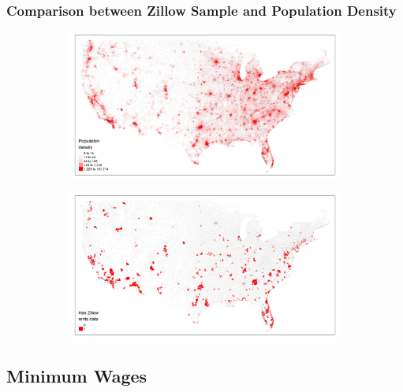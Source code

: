 \documentclass[aspectratio=169]{beamer}
\begin{document}
\begin{frame}
	\frametitle{Comparison between Zillow Sample and Population Density}
    \begin{figure}
    	\centering
    	\begin{subfigure}{0.46\textwidth}
    		\includegraphics[scale = 0.34]{maps_US/output/USPS_zipcodes_pop_density.png}
    	\end{subfigure}%
        \begin{subfigure}{0.46\textwidth}
        	\includegraphics[scale = 0.34]{maps_US/output/USPS_zipcodes_zillow_data.png}
        \end{subfigure}
    \end{figure}
\end{frame}

\subsection{Minimum Wages}
\end{document}
